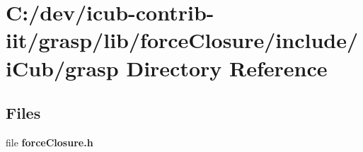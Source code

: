 \section{C\+:/dev/icub-\/contrib-\/iit/grasp/lib/force\+Closure/include/i\+Cub/grasp Directory Reference}
\label{dir_eae50eed8301c2785c3d11a02f513153}
\subsection*{Files}
\begin{DoxyCompactItemize}
\item 
file {\bfseries force\+Closure.\+h}
\end{DoxyCompactItemize}
